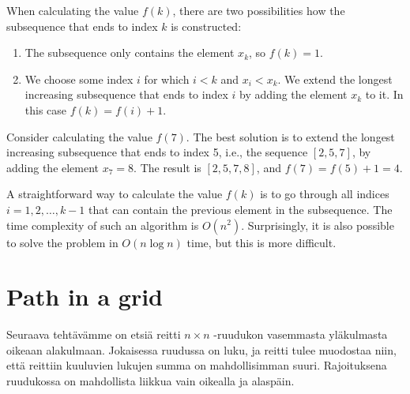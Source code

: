 When calculating the value $f(k)$,
there are two possibilities how the subsequence
that ends to index $k$ is constructed:
\begin{enumerate}
\item The subsequence
only contains the element $x_k$, so $f(k)=1$.
\item We choose some index $i$ for which $i<k$
and $x_i<x_k$.
We extend the longest increasing subsequence
that ends to index $i$ by adding the element $x_k$
to it. In this case $f(k)=f(i)+1$.
\end{enumerate}

Consider calculating the value $f(7)$.
The best solution is to extend the longest
increasing subsequence that ends to index 5,
i.e., the sequence $[2,5,7]$, by adding
the element $x_7=8$.
The result is
$[2,5,7,8]$, and $f(7)=f(5)+1=4$.

A straightforward way to calculate the
value $f(k)$ is to
go through all indices
$i=1,2,\ldots,k-1$ that can contain the
previous element in the subsequence.
The time complexity of such an algorithm is $O(n^2)$.
Surprisingly, it is also possible to solve the
problem in $O(n \log n)$ time, but this is more difficult.

\section{Path in a grid}

Seuraava tehtävämme on etsiä reitti
$n \times n$ -ruudukon vasemmasta yläkulmasta
oikeaan alakulmaan.
Jokaisessa ruudussa on luku, ja reitti
tulee muodostaa niin, että reittiin kuuluvien
lukujen summa on mahdollisimman suuri.
Rajoituksena ruudukossa on mahdollista
liikkua vain oikealla ja alaspäin.

